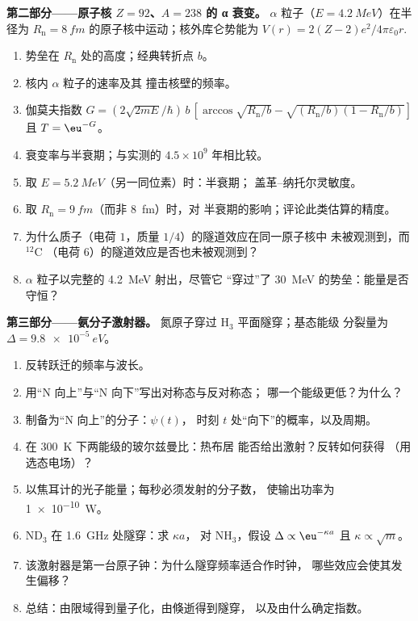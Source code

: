 \begin{problem}
\textbf{第二部分——原子核 $Z = 92$、$A = 238$ 的 α 衰变。}
$\alpha$ 粒子（$E = \qty{4.2}{MeV}$）在半径为
$R_{\text{n}} = \qty{8}{fm}$ 的原子核中运动；核外库仑势能为 $V(r) =
2(Z - 2)e^2/4\pi\varepsilon_0r$.
\begin{enumerate}[resume]
  \item 势垒在 $R_{\text{n}}$ 处的高度；经典转折点
        $b$。
  \item 核内 $\alpha$ 粒子的速率及其
        撞击核壁的频率。
  \item 伽莫夫指数 $G = (2\sqrt{2mE}/\hbar)\,b\,[\arccos\sqrt{R_{\text{n}}/b}
        - \sqrt{(R_{\text{n}}/b)(1 - R_{\text{n}}/b)}]$ 且 $T = \eu^{-G}$。
  \item 衰变率与半衰期；与实测的 $4.5 \times
        10^9$ 年相比较。
  \item 取 $E = \qty{5.2}{MeV}$（另一同位素）时：半衰期；
        盖革–纳托尔灵敏度。
  \item 取 $R_{\text{n}} = \qty{9}{fm}$（而非 \qty{8}{fm}）时，对
        半衰期的影响；评论此类估算的精度。
  \item 为什么质子（电荷 $1$，质量 $1/4$）的隧道效应在同一原子核中
        未被观测到，而 $^{12}$C
        （电荷 $6$）的隧道效应是否也未被观测到？
  \item $\alpha$ 粒子以完整的 \qty{4.2}{MeV} 射出，尽管它
        “穿过”了 \qty{30}{MeV} 的势垒：能量是否守恒？
\end{enumerate}

\textbf{第三部分——氨分子激射器。}
氮原子穿过 H$_3$ 平面隧穿；基态能级
分裂量为 $\Delta = \qty{9.8e-5}{eV}$。
\begin{enumerate}[resume]
  \item 反转跃迁的频率与波长。
  \item 用“N 向上”与“N 向下”写出对称态与反对称态；
        哪一个能级更低？为什么？
  \item 制备为“N 向上”的分子：$\psi(t)$，
        时刻 $t$ 处“向下”的概率，以及周期。
  \item 在 \qty{300}{K} 下两能级的玻尔兹曼比：热布居
        能否给出激射？反转如何获得
        （用选态电场）？
  \item 以焦耳计的光子能量；每秒必须发射的分子数，
        使输出功率为 \qty{1e-10}{W}。
  \item ND$_3$ 在 \qty{1.6}{GHz} 处隧穿：求 $\kappa a$，
        对 NH$_3$，假设 $\Delta \propto \eu^{-\kappa a}$ 且 $\kappa \propto \sqrt{m}$。
  \item 该激射器是第一台原子钟：为什么隧穿频率适合作时钟，
        哪些效应会使其发生偏移？
  \item 总结：由限域得到量子化，由倏逝得到隧穿，
        以及由什么确定指数。
\end{enumerate}
\end{problem}
